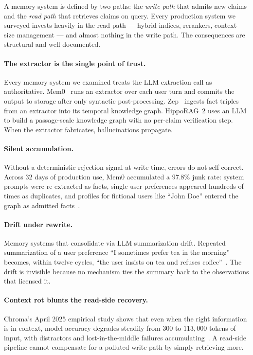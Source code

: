 \documentclass[10pt,a4paper]{article}
\begin{document}
A memory system is defined by two paths: the \emph{write path} that admits
new claims and the \emph{read path} that retrieves claims on query. Every
production system we surveyed invests heavily in the read path --- hybrid
indices, rerankers, context-size management --- and almost nothing in the
write path. The consequences are structural and well-documented.

\paragraph{The extractor is the single point of trust.}
Every memory system we examined treats the LLM extraction call as
authoritative. Mem0~\cite{chhikara2025mem0} runs an extractor over each user
turn and commits the output to storage after only syntactic
post-processing. Zep~\cite{rasmussen2025zep} ingests fact triples from an
extractor into its temporal knowledge graph. HippoRAG~2
\cite{gutierrez2025hipporag2} uses an LLM to build a passage-scale
knowledge graph with no per-claim verification step. When the extractor
fabricates, hallucinations propagate.

\paragraph{Silent accumulation.}
Without a deterministic rejection signal at write time, errors do not
self-correct. Across $32$ days of production use, Mem0 accumulated a
$97.8\%$ junk rate: system prompts were re-extracted as facts, single user
preferences appeared hundreds of times as duplicates, and profiles for
fictional users like ``John Doe'' entered the graph as admitted
facts~\cite{mem0junk}.

\paragraph{Drift under rewrite.}
Memory systems that consolidate via LLM summarization drift. Repeated
summarization of a user preference ``I sometimes prefer tea in the morning''
becomes, within twelve cycles, ``the user insists on tea and refuses
coffee''~\cite{evolvingmemory2026}. The drift is invisible because no
mechanism ties the summary back to the observations that licensed it.

\paragraph{Context rot blunts the read-side recovery.}
Chroma's April 2025 empirical study shows that even when the right
information is in context, model accuracy degrades steadily from $300$ to
$113{,}000$ tokens of input, with distractors and lost-in-the-middle
failures accumulating~\cite{chromarot2025}. A read-side pipeline cannot
compensate for a polluted write path by simply retrieving more.
\end{document}
